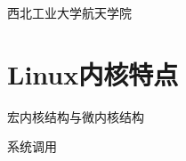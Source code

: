 

\def\lecturename{嵌入式技术}

\title{\insertlecture}

\author{邢超}

\institute
{
  西北工业大学航天学院
}


\subtitle{GNU/Linux 进程}
\date{2015}



\begin{frame}
  \maketitle
\end{frame}


\section{Linux内核特点}

\begin{frame}{宏内核结构与微内核结构}
\begin{center}\end{center}
\end{frame}


\begin{frame}{系统调用}
\begin{center}\end{center}
\end{frame}

